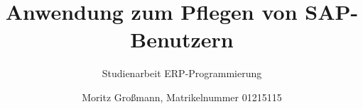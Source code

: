 


	
	\title{Anwendung zum Pflegen von SAP-Benutzern}
	
	\subtitle{Studienarbeit ERP-Programmierung}
	\author{Moritz Großmann, Matrikelnummer 01215115}
	\maketitle
	
	\newpage
	\tableofcontents
	
	\newpage
    
    
    
    
    
    
    
